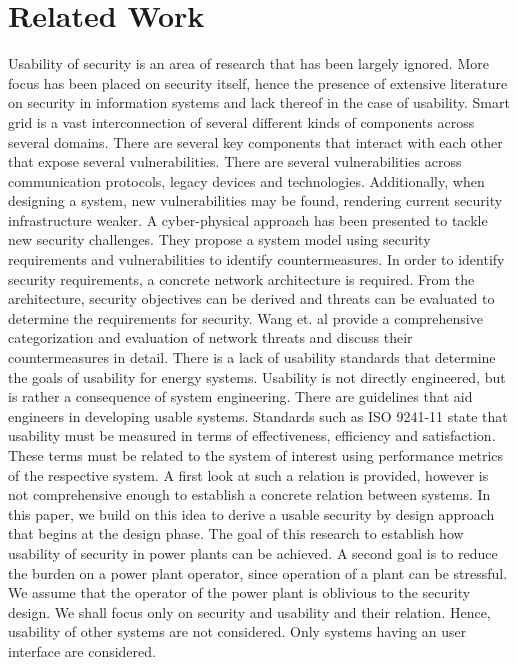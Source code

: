 \section{Related Work}
Usability of security is an area of research that has been largely ignored. More focus has been placed on security itself, hence the presence of extensive literature on security in information systems and lack thereof in the case of usability. Smart grid is a vast interconnection of several different kinds of components across several domains. There are several key components that interact with each other that expose several vulnerabilities\cite{liu2012cyber}. There are several vulnerabilities across communication protocols, legacy devices and technologies. Additionally, when designing a system, new vulnerabilities may be found, rendering current security infrastructure weaker. A cyber-physical approach\cite{mo2012cyber} has been presented to tackle new security challenges. They propose a system model using security requirements and vulnerabilities to identify countermeasures. In order to identify security requirements, a concrete network architecture is required. From the architecture, security objectives can be derived and threats can be evaluated to determine the requirements for security. Wang et. al\cite{wang2013cyber} provide a comprehensive categorization and evaluation of network threats and discuss their countermeasures in detail.
\newline 
There is a lack of usability standards that determine the goals of usability for energy systems. Usability is not directly engineered, but is rather a consequence of system engineering. There are guidelines that aid engineers in developing usable systems\cite{nurse2011guidelines}. Standards such as ISO 9241-11\cite{bevan2015iso} state that usability must be measured in terms of effectiveness, efficiency and satisfaction. These terms must be related to the system of interest using performance metrics of the respective system. A first look at such a relation is provided\cite{kainda2010security}, however is not comprehensive enough to establish a concrete relation between systems. In this paper, we build on this idea to derive a usable security by design approach that begins at the design phase\cite{nielsen1992usability}. The goal of this research to establish how usability of security in power plants can be achieved. A second goal is to reduce the burden on a power plant operator, since operation of a plant can be stressful. We assume that the operator of the power plant is oblivious to the security design. We shall focus only on security and usability and their relation. Hence, usability of other systems are not considered. Only systems having an user interface are considered.


